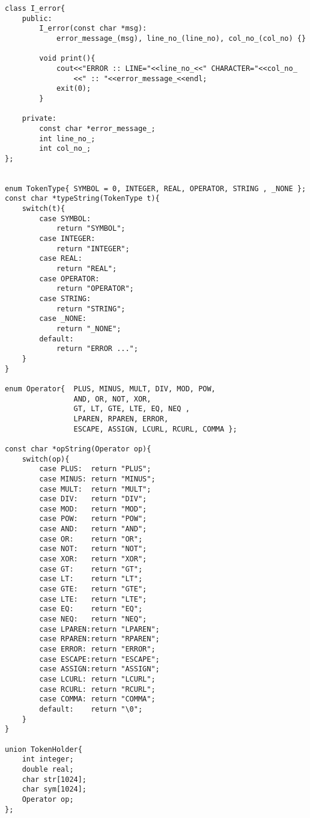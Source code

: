 \documentclass[pdftex,12pt,letterpaper,notitlepage,twoside]{article}
\begin{document}
\begin{lstlisting}[frame=single,caption={C program for testing}]
class I_error{
    public:
        I_error(const char *msg):
            error_message_(msg), line_no_(line_no), col_no_(col_no) {}
            
        void print(){
            cout<<"ERROR :: LINE="<<line_no_<<" CHARACTER="<<col_no_
                <<" :: "<<error_message_<<endl;
            exit(0);
        }
        
    private:
        const char *error_message_;
        int line_no_;
        int col_no_; 
};


enum TokenType{ SYMBOL = 0, INTEGER, REAL, OPERATOR, STRING , _NONE };
const char *typeString(TokenType t){
    switch(t){
        case SYMBOL:
            return "SYMBOL";
        case INTEGER:
            return "INTEGER";
        case REAL:
            return "REAL";
        case OPERATOR:
            return "OPERATOR";
        case STRING:
            return "STRING";
        case _NONE:
            return "_NONE";
        default:
            return "ERROR ...";
    }
}

enum Operator{  PLUS, MINUS, MULT, DIV, MOD, POW,
                AND, OR, NOT, XOR,
                GT, LT, GTE, LTE, EQ, NEQ , 
                LPAREN, RPAREN, ERROR, 
                ESCAPE, ASSIGN, LCURL, RCURL, COMMA };

const char *opString(Operator op){
    switch(op){
        case PLUS:  return "PLUS";
        case MINUS: return "MINUS";
        case MULT:  return "MULT";
        case DIV:   return "DIV";
        case MOD:   return "MOD";
        case POW:   return "POW";
        case AND:   return "AND";
        case OR:    return "OR";
        case NOT:   return "NOT";
        case XOR:   return "XOR";
        case GT:    return "GT";
        case LT:    return "LT";
        case GTE:   return "GTE";
        case LTE:   return "LTE";
        case EQ:    return "EQ";
        case NEQ:   return "NEQ";
        case LPAREN:return "LPAREN";
        case RPAREN:return "RPAREN";
        case ERROR: return "ERROR";
        case ESCAPE:return "ESCAPE";
        case ASSIGN:return "ASSIGN";
        case LCURL: return "LCURL";
        case RCURL: return "RCURL";
        case COMMA: return "COMMA";
        default:    return "\0";
    }
}

union TokenHolder{
    int integer;
    double real;
    char str[1024];
    char sym[1024];
    Operator op;
};


\end{lstlisting}
\end{document}
